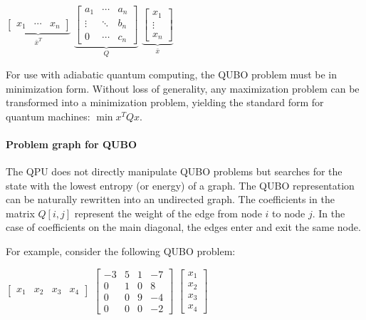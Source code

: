 \begin{center} 
  $\underbrace{\begin{bmatrix}
      x_1 & \cdots & x_n 
  \end{bmatrix}}_{\bar{x}^T}$ 
  $\underbrace{\begin{bmatrix}
      a_1 & \cdots & a_n \\
      \vdots & \ddots & b_n \\
      0 & \cdots & c_n 
  \end{bmatrix}}_{Q}$ 
  $\underbrace{\begin{bmatrix}
      x_1 \\
      \vdots \\
      x_n 
  \end{bmatrix}}_{\bar{x}}$       
\end{center}

For use with adiabatic quantum computing, the QUBO problem must be in minimization form. Without loss of generality, any maximization problem can be transformed into a minimization problem, yielding the standard form for quantum machines: $\min x^T Q x$.

\paragraph{Problem graph for QUBO} The QPU does not directly manipulate QUBO problems but searches for the state with the lowest entropy (or energy) of a graph. The QUBO representation can be naturally rewritten into an undirected graph. The coefficients in the matrix $Q[i, j]$ represent the weight of the edge from node $i$ to node $j$. In the case of coefficients on the main diagonal, the edges enter and exit the same node.

For example, consider the following QUBO problem:

\begin{center} 
  $\begin{bmatrix}
    x_1 & x_2 & x_3 & x_4
  \end{bmatrix}$
  $\begin{bmatrix}
    -3 & 5 & 1 & -7 \\
    0 & 1 & 0 & 8 \\
    0 & 0 & 9 & -4 \\
    0 & 0 & 0 & -2 
  \end{bmatrix}$
  $\begin{bmatrix}
    x_1 \\ x_2 \\ x_3 \\ x_4
  \end{bmatrix}$      
\end{center}

